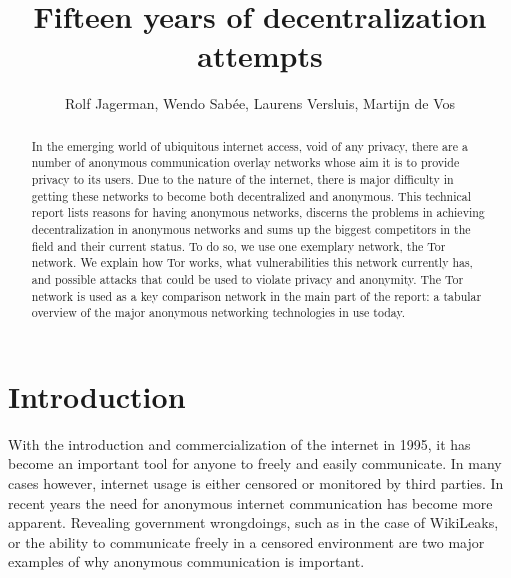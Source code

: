 \documentclass{article}
\begin{document}


\title{Fifteen years of decentralization attempts}
\author{Rolf Jagerman, Wendo Sab\'ee, Laurens Versluis, Martijn de Vos}
\date{}

\pagestyle{empty}


\maketitle
\thispagestyle{empty}

\begin{abstract}
	In the emerging world of ubiquitous internet access, void of any privacy, there are a number of anonymous communication overlay networks whose aim it is to provide privacy to its users. Due to the nature of the internet, there is major difficulty in getting these networks to become both decentralized and anonymous. This technical report lists reasons for having anonymous networks, discerns the problems in achieving decentralization in anonymous networks and sums up the biggest competitors in the field and their current status. To do so, we use one exemplary network, the Tor network. We explain how Tor works, what vulnerabilities this network currently has, and possible attacks that could be used to violate privacy and anonymity. The Tor network is used as a key comparison network in the main part of the report: a tabular overview of the major anonymous networking technologies in use today.
\end{abstract}


\section{Introduction}
	With the introduction and commercialization of the internet in 1995, it has become an important tool for anyone to freely and easily communicate. In many cases however, internet usage is either censored or monitored by third parties. In recent years the need for anonymous internet communication has become more apparent. Revealing government wrongdoings, such as in the case of WikiLeaks, or the ability to communicate freely in a censored environment are two major examples of why anonymous communication is important.
	
\end{document}
